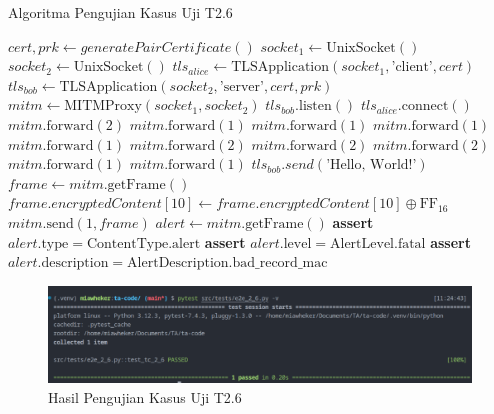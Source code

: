 \begin{algorithm}
  \caption{Algoritma Pengujian Kasus Uji T2.6}
  \label{alg:unit.test.t2.6}
  \begin{algorithmic}
    \State $cert, prk \gets generatePairCertificate()$
    \State $socket_1 \gets \text{UnixSocket}()$
    \State $socket_2 \gets \text{UnixSocket}()$
    \State $tls_{alice} \gets \text{TLSApplication}(socket_1, \text{'client'}, cert)$ 
    \State $tls_{bob} \gets \text{TLSApplication}(socket_2, \text{'server'}, cert, prk)$
    \State $mitm \gets \text{MITMProxy}(socket_1, socket_2)$
    \State
    \State $tls_{bob}.\text{listen}()$  
    \State $tls_{alice}.\text{connect}()$  
    \State
    \State $mitm.\text{forward}(2)$ 
    \State $mitm.\text{forward}(1)$ 
    \State $mitm.\text{forward}(1)$ 
    \State $mitm.\text{forward}(1)$ 
    \State $mitm.\text{forward}(1)$ 
    \State $mitm.\text{forward}(2)$ 
    \State $mitm.\text{forward}(2)$ 
    \State $mitm.\text{forward}(2)$ 
    \State $mitm.\text{forward}(1)$ 
    \State $mitm.\text{forward}(1)$ 
    \State
    \State $tls_{bob}.send(\text{'Hello, World!'})$
    \State $frame \gets mitm.\text{getFrame}()$
    \State $frame.encryptedContent[10] \gets frame.encryptedContent[10] \oplus \text{FF}_{16}$ 
    \State $mitm.\text{send}(1, frame)$
    \State
    \State $alert \gets mitm.\text{getFrame}()$
    \State \textbf{assert} $alert.\text{type} = \text{ContentType.alert}$
    \State \textbf{assert} $alert.\text{level} = \text{AlertLevel.fatal}$
    \State \textbf{assert} $alert.\text{description} = \text{AlertDescription.bad\_record\_mac}$
  \end{algorithmic}
\end{algorithm}

\begin{figure}[ht]
  \centering
  \includegraphics[width=\textwidth]{chapters/res/appendix-4/2.6.png}
  \caption{Hasil Pengujian Kasus Uji T2.6}
  \label{fig:unit.test.t2.6}
\end{figure}

